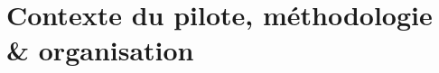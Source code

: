 \chapter{Contexte du pilote, méthodologie \& organisation}
\label{chap:methodo}
\setlength{\parindent}{0pt}















